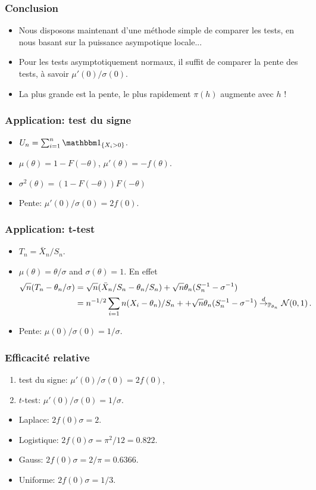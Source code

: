 \begin{frame}
\frametitle{Conclusion}
\begin{itemize}
\item Nous disposons maintenant d'une méthode simple de comparer les tests, en nous basant sur la puissance asympotique locale...
\item Pour les tests asymptotiquement normaux, il suffit de comparer la \alert{pente} des tests, à savoir \alert{$\mu'(0)/\sigma(0)$}.
\item La plus grande est la pente, le plus rapidement $\pi(h)$ augmente avec $h$ !
\end{itemize}
\end{frame}


\begin{frame}
\frametitle{Application: test du signe}
\begin{itemize}
\item $U_n= \sum_{i=1}^n \indi{X_i > 0}$.
\item $\mu(\theta)= 1 - F(-\theta)$, $\mu'(\theta)= - f(\theta)$.
\item $\sigma^2(\theta)= (1 - F(-\theta)) F(-\theta)$
\item \alert{Pente:} $\mu'(0)/\sigma(0)= 2 f(0)$.
\end{itemize}
\end{frame}

\begin{frame}
\frametitle{Application: t-test}
\begin{itemize}
\item $T_n = \bar{X}_n/S_n$.
\item $\mu(\theta)= \theta/\sigma$ and $\sigma(\theta)= 1$. En effet
\begin{align*}
\sqrt{n} ( T_n - \theta_n/\sigma)
&= \sqrt{n} ( \bar{X}_n / S_n - \theta_n / S_n) + \sqrt{n} \theta_n (S_n^{-1} - \sigma^{-1}) \\
&= n^{-1/2} \sum_{i=1}n (X_i - \theta_n)/S_n + + \sqrt{n} \theta_n (S_n^{-1} - \sigma^{-1}) \stackrel{d}{\rightarrow}_{\operatorname{{\mathbb P}}_{\theta_n}} \mathcal{N}(0,1) \,.
\end{align*}
\item \alert{Pente:} $\mu(0)/\sigma(0)= 1/\sigma$.
\end{itemize}
\end{frame}

\begin{frame}
\frametitle{Efficacité relative}
\begin{enumerate}
\item test du signe: $\mu'(0)/\sigma(0)=2 f(0)$,
\item $t$-test: $\mu'(0)/\sigma(0)=1/\sigma$.
\end{enumerate}

\begin{itemize}
\item Laplace: $2 f(0) \sigma = 2$.
\item Logistique: $2 f(0) \sigma = \pi^2/12=0.822$.
\item Gauss: $2 f(0) \sigma = 2/\pi=0.6366$.
\item Uniforme: $2 f(0) \sigma = 1/3$.
\end{itemize}
\end{frame}

